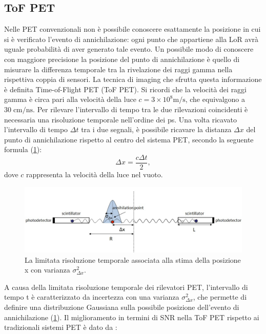 \subsection{ToF PET}
Nelle PET convenzionali non è possibile conoscere esattamente la posizione in cui si è verificato l'evento di annichilazione: ogni punto che appartiene alla LoR avrà uguale probabilità di aver generato tale evento. Un possibile modo di conoscere con maggiore precisione la posizione del punto di annichilazione è quello di misurare la differenza temporale tra la rivelazione dei raggi gamma nella rispettiva coppia di sensori. La tecnica di imaging che sfrutta questa informazione è definita Time-of-Flight PET (ToF PET). Si ricordi che la velocità dei raggi gamma è circa pari alla velocità della luce $c=3 \times 10^8 \text{m/s}$, che equivalgono a $30  \; \text{cm/ns}$. Per rilevare l'intervallo di tempo tra le due rilevazioni coincidenti è necessaria una risoluzione temporale nell'ordine dei \unit{\pico\second}. Una volta ricavato l'intervallo di tempo $\Delta t$ tra i due segnali, è possibile ricavare la distanza $\Delta x$ del punto di annichilazione rispetto al centro del sistema PET, secondo la seguente formula (\Fig\ref{fig:tof_distribution})\cite{Spanoudaki2010}:
\begin{equation}
	\Delta x=\frac{c\Delta t}{2},
\end{equation}
dove $c$ rappresenta la velocità della luce nel vuoto.
\begin{figure}[tbh]
	\centering
	\includegraphics[width=\linewidth]{./ImageFiles/tof_distribution.jpg}
	\caption{La limitata risoluzione temporale associata alla stima della posizione \textDelta x con varianza $\sigma^2_{\Delta x}$\cite{Spanoudaki2010}.}
	\label{fig:tof_distribution}
\end{figure}
A causa della limitata risoluzione temporale dei rilevatori PET, l'intervallo di tempo \textDelta t è caratterizzato da incertezza con una varianza $\sigma^2_{\Delta x}$, che permette di definire una distribuzione Gaussiana sulla possibile posizione dell'evento di annichilazione (\Fig\ref{fig:tof_distribution}). Il miglioramento in termini di SNR nella ToF PET rispetto ai tradizionali sistemi PET è dato da \cite{Jiang2019}:
